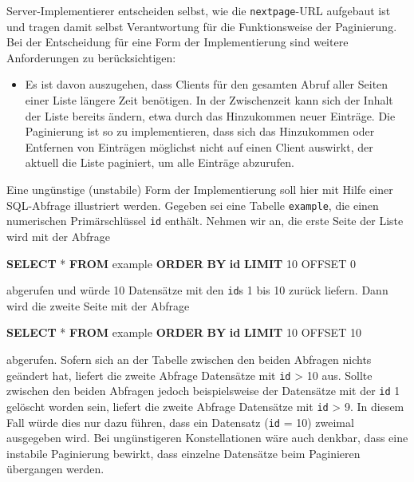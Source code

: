 \documentclass[,a4paper]{article}
\newenvironment{Shaded}{}{}
\newcommand{\KeywordTok}[1]{\textcolor[rgb]{0.00,0.44,0.13}{\textbf{{#1}}}}
\newcommand{\DecValTok}[1]{\textcolor[rgb]{0.25,0.63,0.44}{{#1}}}
\newcommand{\NormalTok}[1]{{#1}}
\begin{document}
Server-Implementierer entscheiden selbst, wie die \texttt{nextpage}-URL
aufgebaut ist und tragen damit selbst Verantwortung für die
Funktionsweise der Paginierung. Bei der Entscheidung für eine Form der
Implementierung sind weitere Anforderungen zu berücksichtigen:

\begin{itemize}
\itemsep1pt\parskip0pt
\item
  Es ist davon auszugehen, dass Clients für den gesamten Abruf aller
  Seiten einer Liste längere Zeit benötigen. In der Zwischenzeit kann
  sich der Inhalt der Liste bereits ändern, etwa durch das Hinzukommen
  neuer Einträge. Die Paginierung ist so zu implementieren, dass sich
  das Hinzukommen oder Entfernen von Einträgen möglichst nicht auf einen
  Client auswirkt, der aktuell die Liste paginiert, um alle Einträge
  abzurufen.
\end{itemize}

Eine ungünstige (unstabile) Form der Implementierung soll hier mit Hilfe
einer SQL-Abfrage illustriert werden. Gegeben sei eine Tabelle
\texttt{example}, die einen numerischen Primärschlüssel \texttt{id}
enthält. Nehmen wir an, die erste Seite der Liste wird mit der Abfrage

\begin{Shaded}
\begin{Highlighting}[]
\KeywordTok{SELECT} \NormalTok{* }\KeywordTok{FROM} \NormalTok{example }\KeywordTok{ORDER} \KeywordTok{BY} \KeywordTok{id} \KeywordTok{LIMIT} \DecValTok{10} \NormalTok{OFFSET }\DecValTok{0}
\end{Highlighting}
\end{Shaded}

abgerufen und würde 10 Datensätze mit den \texttt{id}s 1 bis 10 zurück
liefern. Dann wird die zweite Seite mit der Abfrage

\begin{Shaded}
\begin{Highlighting}[]
\KeywordTok{SELECT} \NormalTok{* }\KeywordTok{FROM} \NormalTok{example }\KeywordTok{ORDER} \KeywordTok{BY} \KeywordTok{id} \KeywordTok{LIMIT} \DecValTok{10} \NormalTok{OFFSET }\DecValTok{10}
\end{Highlighting}
\end{Shaded}

abgerufen. Sofern sich an der Tabelle zwischen den beiden Abfragen
nichts geändert hat, liefert die zweite Abfrage Datensätze mit
\texttt{id} \textgreater{} 10 aus. Sollte zwischen den beiden Abfragen
jedoch beispielsweise der Datensätze mit der \texttt{id} 1 gelöscht
worden sein, liefert die zweite Abfrage Datensätze mit \texttt{id}
\textgreater{} 9. In diesem Fall würde dies nur dazu führen, dass ein
Datensatz (\texttt{id} = 10) zweimal ausgegeben wird. Bei ungünstigeren
Konstellationen wäre auch denkbar, dass eine instabile Paginierung
bewirkt, dass einzelne Datensätze beim Paginieren übergangen werden.
\end{document}
